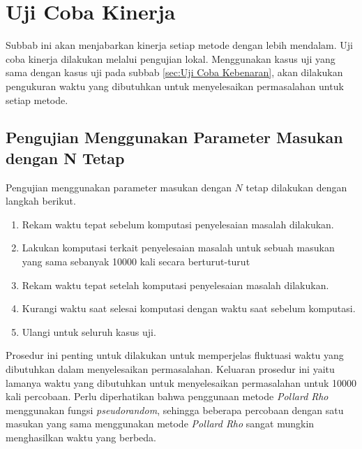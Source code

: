 \section{Uji Coba Kinerja}

Subbab ini akan menjabarkan kinerja setiap metode dengan lebih mendalam. Uji coba kinerja dilakukan melalui pengujian lokal. Menggunakan kasus uji yang sama dengan kasus uji pada subbab \ref{sec:Uji Coba Kebenaran}, akan dilakukan pengukuran waktu yang dibutuhkan untuk menyelesaikan permasalahan untuk setiap metode.

\subsection{Pengujian Menggunakan Parameter Masukan dengan N Tetap}

Pengujian menggunakan parameter masukan dengan $ N $ tetap dilakukan dengan langkah berikut.
\begin{enumerate}
	\item Rekam waktu tepat sebelum komputasi penyelesaian masalah dilakukan.
	\item Lakukan komputasi terkait penyelesaian masalah untuk sebuah masukan yang sama sebanyak 10000 kali secara berturut-turut
	\item Rekam waktu tepat setelah komputasi penyelesaian masalah dilakukan.
	\item Kurangi waktu saat selesai komputasi dengan waktu saat sebelum komputasi.
	\item Ulangi untuk seluruh kasus uji.
\end{enumerate}

Prosedur ini penting untuk dilakukan untuk memperjelas fluktuasi waktu yang dibutuhkan dalam menyelesaikan permasalahan. Keluaran prosedur ini yaitu lamanya waktu yang dibutuhkan untuk menyelesaikan permasalahan untuk 10000 kali percobaan. Perlu diperhatikan bahwa penggunaan metode \textit{Pollard Rho} menggunakan fungsi \textit{pseudorandom}, sehingga beberapa percobaan dengan satu masukan yang sama menggunakan metode \textit{Pollard Rho} sangat mungkin menghasilkan waktu yang berbeda.

